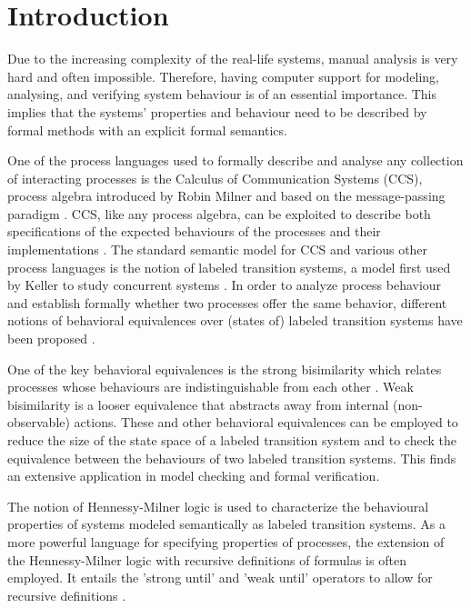 \section{Introduction}

Due to the increasing complexity of the real-life systems, manual analysis is very hard and often impossible. Therefore, having computer support for modeling, analysing, and verifying system behaviour is of an essential importance. This implies that the systems' properties and behaviour need to be described by formal methods with an explicit formal semantics.

One of the process languages used to formally describe and analyse any collection of interacting processes is the Calculus of Communication Systems (CCS), process algebra introduced by Robin Milner and based on the message-passing paradigm \cite{Milner1}\cite{Milner2}. CCS, like any process algebra, can be exploited to describe both specifications of the expected behaviours of the processes and their implementations \cite{HandbookProcessAlgebra}. The standard semantic model for CCS and various other process languages is the notion of labeled transition systems, a model first used by Keller to study concurrent systems \cite{Keller}. In order to analyze process behaviour and establish formally whether two processes offer the same behavior, different notions of behavioral equivalences over (states of) labeled transition systems have been proposed \cite{ReactiveSystems}.

One of the key behavioral equivalences is the strong bisimilarity \cite{Park} which relates processes whose behaviours are indistinguishable from each other \cite{UnderstandingConcurrentSystems}. Weak bisimilarity \cite{Milner1}\cite{Milner3} is a looser equivalence that abstracts away from internal (non-observable) actions. These and other behavioral equivalences can be employed to reduce the size of the state space of a labeled transition system and to check the equivalence between the behaviours of two labeled transition systems. This finds an extensive application in model checking and formal verification\cite{ModelChecking}\cite{ReactiveSystems}.

The notion of Hennessy-Milner logic \cite{HennessyMilner} is used to characterize the behavioural properties of systems modeled semantically as labeled transition systems. As a more powerful language for specifying properties of processes, the extension of the Hennessy-Milner logic with recursive definitions of formulas \cite{Larsen} is often employed. It entails the 'strong until' and 'weak until' operators to allow for recursive definitions \cite{ReactiveSystems}.

